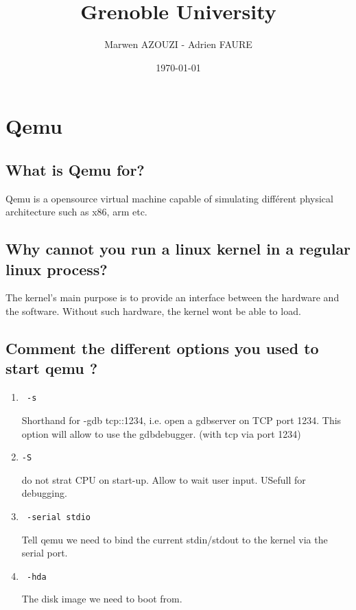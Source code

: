 \documentclass[10]{article}
\begin{document}
\title{Grenoble University}
\author{Marwen AZOUZI - Adrien FAURE}
\date{\today}
\maketitle

\section{Qemu}

\subsection{What is Qemu for?}
Qemu is a opensource virtual machine capable of simulating différent physical architecture such as x86, arm etc.
\subsection{Why cannot you run a linux kernel in a regular linux process?}
The kernel's main purpose is to provide an interface between the hardware and the software.
 Without such hardware, the  kernel wont be able to load.
\subsection{Comment the different options you used to start qemu ?}
\begin{enumerate}
	\item
		\begin{verbatim} -s \end{verbatim} 
		 Shorthand for -gdb tcp::1234, i.e. open a gdbserver on TCP port 1234. 	
		This option will allow to use the gdbdebugger. (with tcp via port 1234)
	\item 
		\begin{verbatim}-S \end{verbatim}  
		do not strat CPU on start-up. Allow to wait user input. USefull for debugging.
	\item \begin{verbatim} -serial stdio \end{verbatim} 
	Tell qemu we need to bind the current stdin/stdout to the kernel via the serial port. 	
	\item  
		\begin{verbatim} -hda \end{verbatim}  
		The disk image we need to boot from.
		
\end{enumerate}
\end{document}
